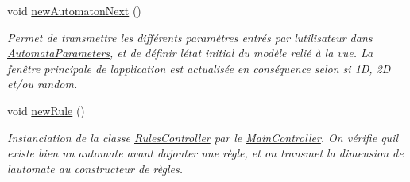 \begin{DoxyCompactItemize}
void \mbox{\hyperlink{class_main_controller_ae5a21e0d0566b2963618e822ad9d5f74}{new\+Automaton\+Next}} ()
\begin{DoxyCompactList}\small\item\em Permet de transmettre les différents paramètres entrés par l\textquotesingle{}utilisateur dans \mbox{\hyperlink{class_automata_parameters}{Automata\+Parameters}}, et de définir l\textquotesingle{}état initial du modèle relié à la vue. La fenêtre principale de l\textquotesingle{}application est actualisée en conséquence selon si 1D, 2D et/ou random. \end{DoxyCompactList}\item 
void \mbox{\hyperlink{class_main_controller_a8083c60cac9d1982633ad543900280a7}{new\+Rule}} ()
\begin{DoxyCompactList}\small\item\em Instanciation de la classe \mbox{\hyperlink{class_rules_controller}{Rules\+Controller}} par le \mbox{\hyperlink{class_main_controller}{Main\+Controller}}. On vérifie qu\textquotesingle{}il existe bien un automate avant d\textquotesingle{}ajouter une règle, et on transmet la dimension de l\textquotesingle{}automate au constructeur de règles. \end{DoxyCompactList}\end{DoxyCompactItemize}
